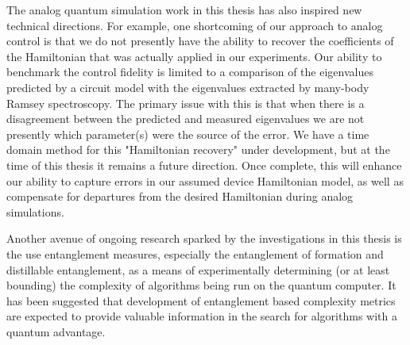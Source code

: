 The analog quantum simulation work in this thesis has also inspired new technical directions.
For example, one shortcoming of our approach to analog control is that we do not presently have the ability to recover the coefficients of the Hamiltonian that was actually applied in our experiments.
Our ability to benchmark the control fidelity is limited to a comparison of the eigenvalues predicted by a circuit model with the eigenvalues extracted by many-body Ramsey spectroscopy.
The primary issue with this is that when there is a disagreement between the predicted and measured eigenvalues we are not presently which parameter(s) were the source of the error.
We have a time domain method for this "Hamiltonian recovery" under development, but at the time of this thesis it remains a future direction.
Once complete, this will enhance our ability to capture errors in our assumed device Hamiltonian model, as well as compensate for departures from the desired Hamiltonian during analog simulations.

Another avenue of ongoing research sparked by the investigations in this thesis is the use entanglement measures,
especially the entanglement of formation and distillable entanglement,
as a means of experimentally determining (or at least bounding) the complexity of algorithms being run on the quantum computer.
It has been suggested that development of entanglement based complexity metrics are expected to provide valuable information in the search for algorithms with a quantum advantage.\cite{JensPrivateComm}

